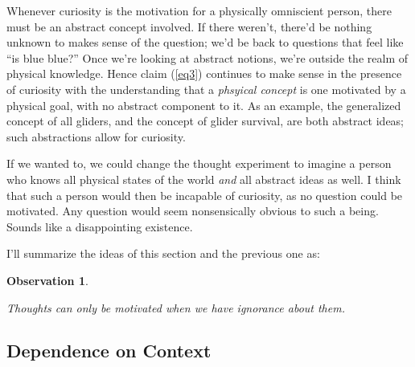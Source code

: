 \documentclass[11pt, oneside]{article}   	%
\newtheorem{obs}{Observation}
\begin{document}
Whenever curiosity is the motivation for a physically omniscient person, there
must be an abstract concept involved. If there weren't, there'd be
nothing unknown to makes sense of the question; we'd be back to questions
that feel like
``is blue blue?''
Once we're looking at abstract
notions, we're outside the realm of physical knowledge.
Hence claim (\ref{eq3}) continues to make sense in
the presence of curiosity with the understanding that a
{\em phsyical concept} is one motivated by a physical goal, with
no abstract component to it.
As an example,
the generalized
concept of all gliders, and the concept of glider survival, are both
abstract ideas; such abstractions allow for curiosity.

If we wanted to, we could change the thought experiment to imagine a person who
knows all physical states of the world {\em and} all abstract ideas as well. I
think that such a person would then be incapable of curiosity, as no question
could be motivated. Any question would seem nonsensically obvious
to such a being. Sounds like a disappointing existence.


I'll summarize the ideas of this section and the previous one as:
\newcommand{\obsfive}{
    Thoughts can only be motivated when we have ignorance about them.
}
\begin{obs}\label{o5}
    \obsfive
\end{obs}

\subsection{Dependence on Context}
\end{document}
